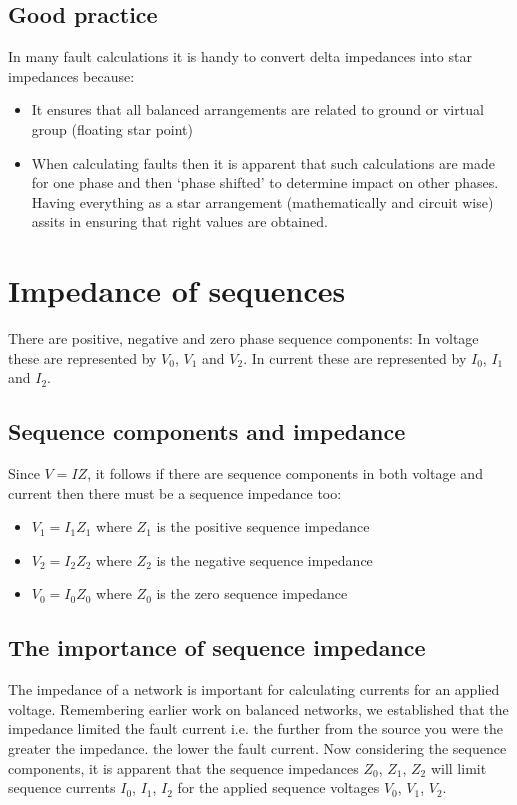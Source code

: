 \documentclass[class=report, crop=false, 12pt,a4paper]{standalone}
\begin{document}
\subsection{Good practice}
In many fault calculations it is handy to convert delta impedances into star impedances because:
\begin{itemize}
	\item It ensures that all balanced arrangements are related to ground or virtual group (floating star point)
	\item When calculating faults then it is apparent that such calculations are made for one phase and then `phase shifted' to determine impact on other phases. Having everything as a star arrangement (mathematically and circuit wise) assits in ensuring that right values are obtained.
\end{itemize}
\section{Impedance of sequences}
There are positive, negative and zero phase sequence components: In voltage these are represented by $V_0$, $V_1$ and $V_2$. In current these are represented by $I_0$, $I_1$ and $I_2$.
\subsection{Sequence components and impedance}
Since $V=IZ$, it follows if there are sequence components in both voltage and current then there must be a sequence impedance too:
\begin{itemize}
	\item $V_1 = I_1 Z_1$ where $Z_1$ is the positive sequence impedance
	\item $V_2 = I_2 Z_2$ where $Z_2$ is the negative sequence impedance
	\item $V_0 = I_0 Z_0$ where $Z_0$ is the zero sequence impedance
\end{itemize}
\subsection{The importance of sequence impedance}
The impedance of a network is important for calculating currents for an applied voltage. Remembering earlier work on balanced networks, we established that the impedance limited the fault current i.e. the further from the source you were the greater the impedance. the lower the fault current. Now considering the sequence components, it is apparent that the sequence impedances $Z_0$, $Z_1$, $Z_2$ will limit sequence currents $I_0$, $I_1$, $I_2$ for the applied sequence voltages $V_0$, $V_1$, $V_2$.
\end{document}
